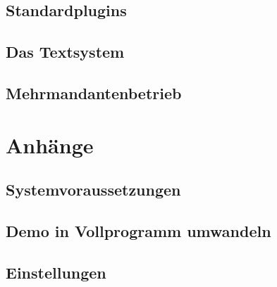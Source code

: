 \documentclass[paper=a4,BCOR8.25mm,twoside]{scrbook}
\begin{document}
\chapter{Standardplugins}
	
	
	
	
	
	
	
	
	
	
	
	
	
	
	
	

	
\chapter{Das Textsystem}
	
	
	


\chapter{Mehrmandantenbetrieb}
	
	
%
\part{Anhänge}
\appendix

\chapter{Systemvoraussetzungen}
	
\chapter{Demo in Vollprogramm umwandeln}
	
\chapter{Einstellungen}
	
\end{document}
